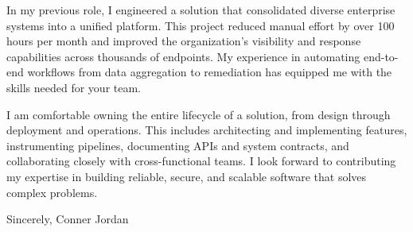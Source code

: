 \documentclass[letterpaper,11pt]{article}
\begin{document}
In my previous role, I engineered a solution that consolidated diverse enterprise systems into a unified platform. This project reduced manual effort by over 100 hours per month and improved the organization's visibility and response capabilities across thousands of endpoints. My experience in automating end-to-end workflows from data aggregation to remediation has equipped me with the skills needed for your team.

\vspace{16pt}

I am comfortable owning the entire lifecycle of a solution, from design through deployment and operations. This includes architecting and implementing features, instrumenting pipelines, documenting APIs and system contracts, and collaborating closely with cross-functional teams. I look forward to contributing my expertise in building reliable, secure, and scalable software that solves complex problems.

\vspace{16pt}

Sincerely,  
Conner Jordan
\end{document}

